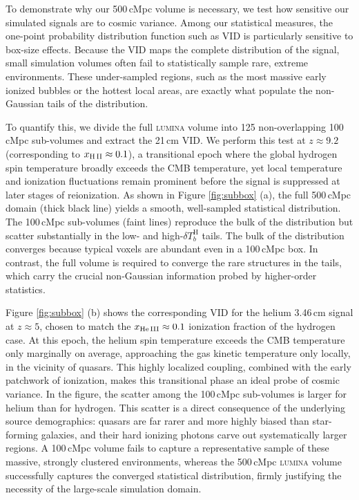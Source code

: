 \documentclass[apj,twocolumn, appendixfloats, twocolappendix, numberedappendix, tighten]{openjournal}
\DeclareRobustCommand{\lumina}{\mbox{\textsc{lumina}}\xspace}
\begin{document}
To demonstrate why our 500\,cMpc volume is necessary, we test how sensitive our simulated signals are to cosmic variance. Among our statistical measures, the one-point probability distribution function such as VID is particularly sensitive to box-size effects. Because the VID maps the complete distribution of the signal, small simulation volumes often fail to statistically sample rare, extreme environments. These under-sampled regions, such as the most massive early ionized bubbles or the hottest local areas, are exactly what populate the non-Gaussian tails of the distribution.


To quantify this, we divide the full \lumina volume into 125 non-overlapping 100\,cMpc sub-volumes and extract the 21\,cm VID. We perform this test at $z \approx 9.2$ (corresponding to $x_{\rm H\,II} \approx 0.1$), a transitional epoch where the global hydrogen spin temperature broadly exceeds the CMB temperature, yet local temperature and ionization fluctuations remain prominent before the signal is suppressed at later stages of reionization. As shown in Figure \ref{fig:subbox} (a), the full 500\,cMpc domain (thick black line) yields a smooth, well-sampled statistical distribution. The 100\,cMpc sub-volumes (faint lines) reproduce the bulk of the distribution but scatter substantially in the low- and high-$\delta T_b^\mathrm{H}$ tails. The bulk of the distribution converges because typical voxels are abundant even in a 100\,cMpc box. In contrast, the full volume is required to converge the rare structures in the tails, which carry the crucial non-Gaussian information probed by higher-order statistics.


Figure \ref{fig:subbox} (b) shows the corresponding VID for the helium 3.46\,cm signal at $z \approx 5$, chosen to match the $x_{\rm He\,III} \approx 0.1$ ionization fraction of the hydrogen case. At this epoch, the helium spin temperature exceeds the CMB temperature only marginally on average, approaching the gas kinetic temperature only locally, in the vicinity of quasars. This highly localized coupling, combined with the early patchwork of ionization, makes this transitional phase an ideal probe of cosmic variance. In the figure, the scatter among the 100\,cMpc sub-volumes is larger for helium than for hydrogen. This scatter is a direct consequence of the underlying source demographics: quasars are far rarer and more highly biased than star-forming galaxies, and their hard ionizing photons carve out systematically larger  regions. A 100\,cMpc volume fails to capture a representative sample of these massive, strongly clustered environments, whereas the 500\,cMpc \lumina volume successfully captures the converged statistical distribution, firmly justifying the necessity of the large-scale simulation domain.
\end{document}
